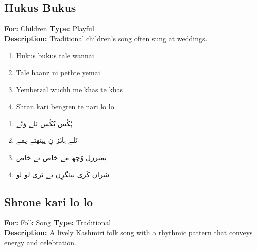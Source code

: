 \documentclass[12pt]{article}
\newcommand{\bigroman}[1]{\fontsize{16pt}{18pt}\selectfont\RaggedRight #1}
\newcommand{\bigarabic}[1]{\fontsize{16pt}{18pt}\selectfont \textarabic{#1}}
\begin{document}
\subsection*{Hukus Bukus}
\textbf{For:} Children \quad \textbf{Type:} Playful\\
\textbf{Description:} Traditional children's song often sung at weddings.

\begin{multicols}{2}
\begin{enumerate}[leftmargin=*, label=\arabic*., font=\fontsize{16pt}{18pt}\selectfont]
  \item \bigroman{Hukus bukus tale wannai}
  \item \bigroman{Tale haanz ni pethte yemai}
  \item \bigroman{Yemberzal wuchh me khas te khas}
  \item \bigroman{Shran kari bengren te nari lo lo}
\end{enumerate}

\columnbreak

\begin{RTL}
\begin{enumerate}[leftmargin=*, label=\arabic*., font=\fontsize{16pt}{18pt}\selectfont]
  \item \bigarabic{ہُکُس بُکُس تَلے وَنّے}
  \item \bigarabic{تَلے ہانٛز نِ پیتھتے یمے}
  \item \bigarabic{یمبرزل وُچھ مے خاص تے خاص}
  \item \bigarabic{شران کَری بینٛگرِن تے نَری لو لو}
\end{enumerate}
\end{RTL}
\end{multicols}

\subsection*{Shrone kari lo lo}
\textbf{For:} Folk Song \quad \textbf{Type:} Traditional\\
\textbf{Description:} A lively Kashmiri folk song with a rhythmic pattern that conveys energy and celebration.
\end{document}
